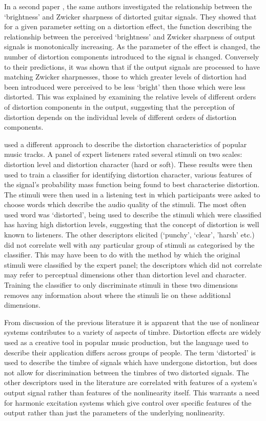 	In a second paper \citep{tsumoto2016the}, the same authors investigated the relationship between the `brightness'
	and Zwicker sharpness of distorted guitar signals. They showed that for a given parameter setting on a distortion
	effect, the function describing the relationship between the perceived `brightness' and Zwicker sharpness of output
	signals is monotonically increasing. As the parameter of the effect is changed, the number of distortion components
	introduced to the signal is changed. Conversely to their predictions, it was shown that if the output signals are
	processed to have matching Zwicker sharpnesses, those to which greater levels of distortion had been introduced
	were perceived to be less `bright' then those which were less distorted. This was explained by examining the
	relative levels of different orders of distortion components in the output, suggesting that the perception of
	distortion depends on the individual levels of different orders of distortion components.

	\citet{wilson2014characterisation} used a different approach to describe the distortion characteristics of popular
	music tracks. A panel of expert listeners rated several stimuli on two scales: distortion level and distortion
	character (hard or soft). These results were then used to train a classifier for identifying distortion character,
	various features of the signal's probability mass function being found to best characterise distortion. The stimuli
	were then used in a listening test in which participants were asked to choose words which describe the audio
	quality of the stimuli. The most often used word was `distorted', being used to describe the stimuli which were
	classified has having high distortion levels, suggesting that the concept of distortion is well known to listeners.
	The other descriptors elicited (`punchy', `clear', 'harsh' etc.) did not correlate well with any particular group
	of stimuli as categorised by the classifier. This may have been to do with the method by which the original stimuli
	were classified by the expert panel; the descriptors which did not correlate may refer to perceptual dimensions
	other than distortion level and character. Training the classifier to only discriminate stimuli in these two
	dimensions removes any information about where the stimuli lie on these additional dimensions.

	From discussion of the previous literature it is apparent that the use of nonlinear systems contributes to a
	variety of aspects of timbre. Distortion effects are widely used as a creative tool in popular music production,
	but the language used to describe their application differs across groups of people. The term `distorted' is used
	to describe the timbre of signals which have undergone distortion, but does not allow for discrimination between
	the timbres of two distorted signals. The other descriptors used in the literature are correlated with features of
	a system's output signal rather than features of the nonlinearity itself. This warrants a need for harmonic
	excitation systems which give control over specific features of the output rather than just the parameters of the
	underlying nonlinearity. 

